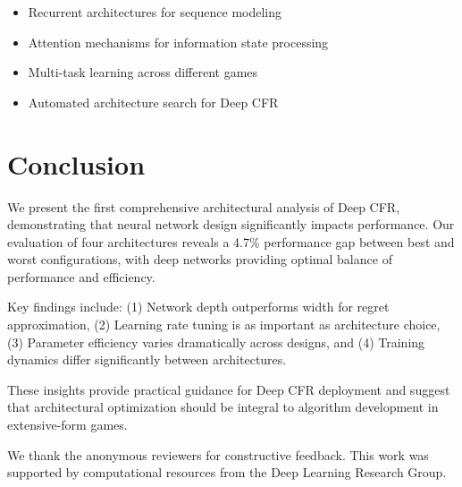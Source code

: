 \documentclass{article}
\begin{document}
\begin{itemize}
\item Recurrent architectures for sequence modeling
\item Attention mechanisms for information state processing
\item Multi-task learning across different games
\item Automated architecture search for Deep CFR
\end{itemize}

\section{Conclusion}

We present the first comprehensive architectural analysis of Deep CFR, demonstrating that neural network design significantly impacts performance. Our evaluation of four architectures reveals a 4.7\% performance gap between best and worst configurations, with deep networks providing optimal balance of performance and efficiency.

Key findings include: (1) Network depth outperforms width for regret approximation, (2) Learning rate tuning is as important as architecture choice, (3) Parameter efficiency varies dramatically across designs, and (4) Training dynamics differ significantly between architectures.

These insights provide practical guidance for Deep CFR deployment and suggest that architectural optimization should be integral to algorithm development in extensive-form games.

\begin{acknowledgments}
We thank the anonymous reviewers for constructive feedback. This work was supported by computational resources from the Deep Learning Research Group.
\end{acknowledgments}
\end{document}
